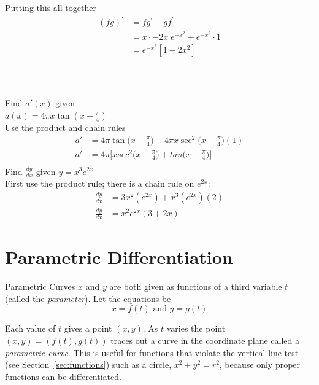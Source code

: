 Putting this all together
\begin{align*}\left (f g\right )^{ \prime } &  = f g^{ \prime } +g f^{ \prime } \\
 &  = x \cdot  -2 x\; e^{ -x^{2}} +e^{ -x^{2}} \cdot 1 \\
 &  = e^{ -x^{2}} \left [1 -2 x^{2}\right ]\end{align*}
\rule{6.8cm}{0.5pt}\\
\begin{multicols}{2}
\example Find $a'(x)$ given \\$a(x)= 4\pi x\tan (x-\frac{\pi}{4})$\medskip\\
\solution Use the product and chain rules \\
	\begin{align*}
	a'&= 4\pi\tan\big(x-\frac{\pi}{4}\big)+4\pi x\sec^2\big(x-\frac{\pi}{4}\big)(1) \\
	a'&= 4\pi\Big[xsec^2\big(x-\frac{\pi}{4}\big)+tan\big(x-\frac{\pi}{4}\big)\Big] \\
	\end{align*}
\examq Find $\frac{dy}{dx}$ given $y=x^3e^{2x}$\medskip\\
\solution First use the product rule; there is a chain rule on 		$e^{2x}$:\begin{align*}\frac{dy}{dx}&=3x^2(e^{2x})+x^3(e^{2x})(2) \\
	\frac{dy}{dx}&=x^2e^{2x}(3+2x)\end{align*}
\end{multicols}

\section{Parametric Differentiation}
Parametric Curves $x$ and $y$ are both given as functions of a third variable $t$ (called the \emph{parameter}). Let the equations be
\begin{equation*}x =f (t)\text{ and }y =g (t)
\end{equation*}

Each value of $t$ gives a point $(x ,y)$. As $t$ varies the point $(x ,y) =(f (t) ,g (t))$ traces out a curve in the coordinate plane called a \emph{parametric curve}. This is useful for functions that violate the vertical line test (see Section~\ref{sec:functions}) such as a circle, $x^2+y^2=r^2$, because only proper functions can be differentiated.

